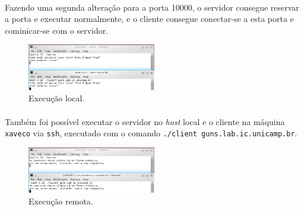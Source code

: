 \documentclass[a4paper,10pt,oneside,final,titlepage,onecolumn]{article}
\begin{document}
\paragraph{}Fazendo uma segunda alteração para a porta 10000, o servidor consegue reservar a porta e executar normalmente, e o cliente consegue conectar-se a esta porta e cominicar-se com o servidor.
\begin{figure}[h!]
  \caption{Execução local.}
  \centering
    \includegraphics[width=0.5\textwidth]{exec-local.png}
\end{figure}
\paragraph{}Também foi possível executar o servidor no \emph{host} local e o cliente na máquina \verb|xaveco| via \verb|ssh|, executado com o comando \verb|./client guns.lab.ic.unicamp.br|.
\begin{figure}[h!]
  \caption{Execução remota.}
  \centering
    \includegraphics[width=0.5\textwidth]{exec-remota.png}
\end{figure}
\end{document}
